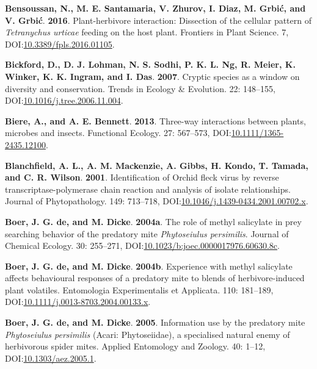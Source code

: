 \documentclass[12pt,final,CPage]{ufthesis}
\newlength{\cslhangindent}
\newenvironment{CSLReferences}[2] %
{%
	\setlength{\parindent}{0pt}
	\ifodd #1 \everypar{\setlength{\hangindent}{\cslhangindent}}\ignorespaces\fi
	\ifnum #2 > 0
	\setlength{\parskip}{#2\baselineskip}
	\fi
}%
{}
\begin{document}
{\begin{CSLReferences}{1}{0}
  \leavevmode{}%
  \textbf{Bensoussan, N., M. E. Santamaria, V. Zhurov, I. Diaz, M. Grbić, and V. Grbić}. \textbf{2016}. Plant-herbivore interaction: Dissection of the cellular pattern of {\emph{Tetranychus urticae}} feeding on the host plant. Frontiers in Plant Science. 7, DOI:\href{https://doi.org/10.3389/fpls.2016.01105}{10.3389/fpls.2016.01105}.

  \leavevmode{}%
  \textbf{Bickford, D., D. J. Lohman, N. S. Sodhi, P. K. L. Ng, R. Meier, K. Winker, K. K. Ingram, and I. Das}. \textbf{2007}. Cryptic species as a window on diversity and conservation. Trends in Ecology {\&} Evolution. 22: 148--155, DOI:\href{https://doi.org/10.1016/j.tree.2006.11.004}{10.1016/j.tree.2006.11.004}.

  \leavevmode{}%
  \textbf{Biere, A., and A. E. Bennett}. \textbf{2013}. Three-way interactions between plants, microbes and insects. Functional Ecology. 27: 567--573, DOI:\href{https://doi.org/10.1111/1365-2435.12100}{10.1111/1365-2435.12100}.

  \leavevmode{}%
  \textbf{Blanchfield, A. L., A. M. Mackenzie, A. Gibbs, H. Kondo, T. Tamada, and C. R. Wilson}. \textbf{2001}. Identification of {Orchid fleck virus} by reverse transcriptase-polymerase chain reaction and analysis of isolate relationships. Journal of Phytopathology. 149: 713--718, DOI:\href{https://doi.org/10.1046/j.1439-0434.2001.00702.x}{10.1046/j.1439-0434.2001.00702.x}.

  \leavevmode{}%
  \textbf{Boer, J. G. de, and M. Dicke}. \textbf{2004a}. The role of methyl salicylate in prey searching behavior of the predatory mite {\emph{Phytoseiulus persimilis}}. Journal of Chemical Ecology. 30: 255--271, DOI:\href{https://doi.org/10.1023/b:joec.0000017976.60630.8c}{10.1023/b:joec.0000017976.60630.8c}.

  \leavevmode{}%
  \textbf{Boer, J. G. de, and M. Dicke}. \textbf{2004b}. Experience with methyl salicylate affects behavioural responses of a predatory mite to blends of herbivore-induced plant volatiles. Entomologia Experimentalis et Applicata. 110: 181--189, DOI:\href{https://doi.org/10.1111/j.0013-8703.2004.00133.x}{10.1111/j.0013-8703.2004.00133.x}.

  \leavevmode{}%
  \textbf{Boer, J. G. de, and M. Dicke}. \textbf{2005}. Information use by the predatory mite {\emph{Phytoseiulus persimilis}} {({Acari}: {Phytoseiidae})}, a specialised natural enemy of herbivorous spider mites. Applied Entomology and Zoology. 40: 1--12, DOI:\href{https://doi.org/10.1303/aez.2005.1}{10.1303/aez.2005.1}.


\end{CSLReferences}}
\end{document}
